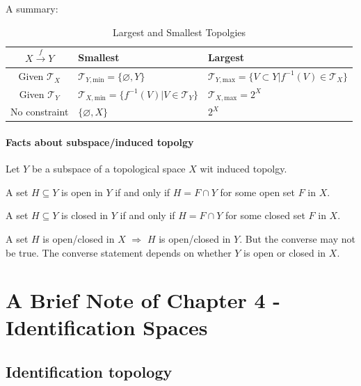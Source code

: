 \documentclass{article}
\begin{document}
A summary:
\begin{table}[H]
    \centering
    \caption{Largest and Smallest Topolgies}
    \begin{tabular}{c l l}
        $X\overset{f}{\to}Y$ & Smallest  &Largest \\
        \hline
        Given $\mathcal{T}_X$ & $\mathcal{T}_{Y,\text{min}}=\{\varnothing,Y\}$        & $\mathcal{T}_{Y,\text{max}}=\{ V\subset Y| f^{-1}(V)\in \mathcal{T}_X\}$\\
        Given $\mathcal{T}_Y$ & $\mathcal{T}_{X,\text{min}}=\{f^{-1}(V)|V\in\mathcal{T}_Y\}$ & $\mathcal{T}_{X,\text{max}}=2^X$ \\
        No constraint & $\{\varnothing,X\}$ & $2^X$ \\
        \hline
    \end{tabular}
\end{table}
\paragraph{Facts about subspace/induced topolgy}
Let $Y$ be a subspace of a topological space $X$ wit induced topolgy.
\begin{fact}
    A set $H\subseteq Y$ is open in $Y$ if and only if $H=F\cap Y$
    for some open set $F$ in $X$.
\end{fact}
\begin{fact}
    A set $H\subseteq Y$ is closed in $Y$ if and only if $H=F\cap Y$
    for some closed set $F$ in $X$.
\end{fact}
\begin{fact}
    A set $H$ is open/closed in $X$ $\Rightarrow$ $H$ is open/closed
    in $Y$. But the converse may not be true. The converse statement
    depends on whether $Y$ is open or closed in $X$.
\end{fact}
\section{A Brief Note of Chapter 4 - Identification Spaces}
\label{sec:Brief-Note-Chapter-4}
\subsection{Identification topology}
\label{sec:Identification topology}
\end{document}
